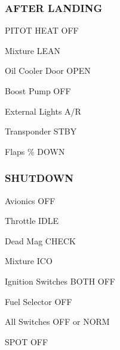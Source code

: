 \begin{multicols}{2}
\subsubsection*{AFTER LANDING}
\begin{enumerate*}
\item PITOT HEAT \dotfill OFF
\item Mixture \dotfill LEAN
\item Oil Cooler Door \dotfill OPEN
\item Boost Pump \dotfill OFF
\item External Lights \dotfill A/R
\item Transponder \dotfill STBY
\item Flaps \% DOWN
\end{enumerate*}

\subsubsection*{SHUTDOWN}
\begin{enumerate*}
\item Avionics \dotfill OFF
\item Throttle \dotfill IDLE
\item Dead Mag \dotfill CHECK
\item Mixture \dotfill ICO
\item Ignition Switches \dotfill BOTH OFF
\item Fuel Selector \dotfill OFF
\item All Switches \dotfill OFF or NORM
\item SPOT \dotfill OFF
\end{enumerate*}
\end{multicols}

\cleardoublepage
\ohead{\leftmark} %
\chead{} %

